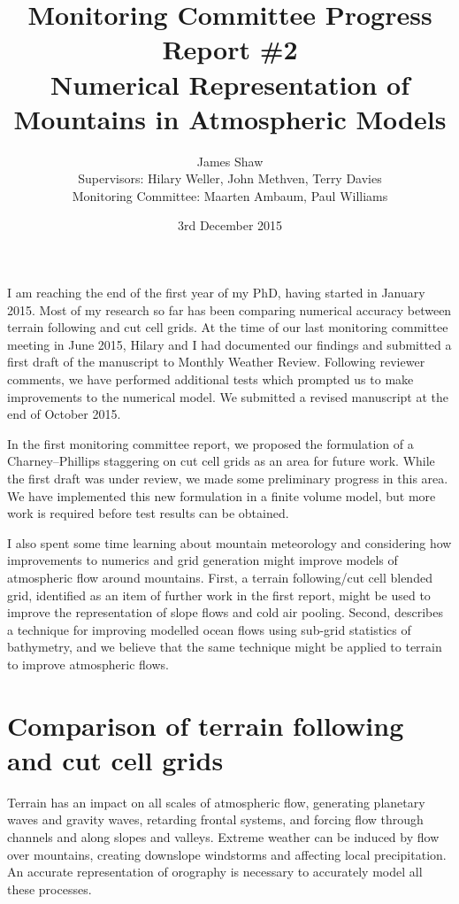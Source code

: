 \documentclass[a4paper]{article}
\title{Monitoring Committee Progress Report \#2\\
\vspace*{1em}
\Large{Numerical Representation of Mountains in Atmospheric Models}}
\author{James Shaw
\vspace{0.5em} \\
\large{Supervisors: Hilary Weller, John Methven, Terry Davies}
\vspace{0.5em} \\
\large{Monitoring Committee: Maarten Ambaum, Paul Williams}}
\date{3rd December 2015}
\begin{document}
\newcommand{\exner}{\Pi}
\newcommand{\TODO}[1]{\textcolor{purple}{TODO: \emph{#1}}}
\maketitle


I am reaching the end of the first year of my PhD, having started in January 2015.  Most of my research so far has been comparing numerical accuracy between terrain following and cut cell grids.
At the time of our last monitoring committee meeting in June 2015, Hilary and I had documented our findings and submitted a first draft of the manuscript to Monthly Weather Review.  Following reviewer comments, we have performed additional tests which prompted us to make improvements to the numerical model.  We submitted a revised manuscript at the end of October 2015.

In the first monitoring committee report, we proposed the formulation of a Charney--Phillips staggering on cut cell grids as an area for future work.  While the first draft was under review, we made some preliminary progress in this area.  We have implemented this new formulation in a finite volume model, but more work is required before test results can be obtained.

I also spent some time learning about mountain meteorology and considering how improvements to numerics and grid generation might improve models of atmospheric flow around mountains.  First, a terrain following/cut cell blended grid, identified as an item of further work in the first report, might be used to improve the representation of slope flows and cold air pooling.  Second, \citet{adcroft2013} describes a technique for improving modelled ocean flows using sub-grid statistics of bathymetry, and we believe that the same technique might be applied to terrain to improve atmospheric flows.

\section{Comparison of terrain following and cut cell grids}
Terrain has an impact on all scales of atmospheric flow, generating planetary waves and gravity waves, retarding frontal systems, and forcing flow through channels and along slopes and valleys.  Extreme weather can be induced by flow over mountains, creating downslope windstorms and affecting local precipitation.  An accurate representation of orography is necessary to accurately model all these processes.
\end{document}
